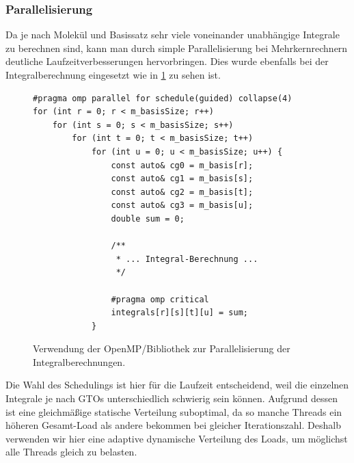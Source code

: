 \subsubsection{Parallelisierung}
Da je nach Molekül und Basissatz sehr viele voneinander unabhängige Integrale zu berechnen sind,
kann man durch simple Parallelisierung bei Mehrkernrechnern deutliche Laufzeitverbesserungen hervorbringen.
Dies wurde ebenfalls bei der Integralberechnung eingesetzt wie in \cref{parallel-impl} zu sehen ist.

\begin{figure}[H]
\begin{verbatim}
#pragma omp parallel for schedule(guided) collapse(4)
for (int r = 0; r < m_basisSize; r++)
    for (int s = 0; s < m_basisSize; s++)
        for (int t = 0; t < m_basisSize; t++)
            for (int u = 0; u < m_basisSize; u++) {
                const auto& cg0 = m_basis[r];
                const auto& cg1 = m_basis[s];
                const auto& cg2 = m_basis[t];
                const auto& cg3 = m_basis[u];
                double sum = 0;

                /**
                 * ... Integral-Berechnung ...
                 */
                
                #pragma omp critical
                integrals[r][s][t][u] = sum;
            }
\end{verbatim}
\caption{Verwendung der OpenMP\-/Bibliothek zur Parallelisierung der Integralberechnungen.}
\label{parallel-impl}
\end{figure}

Die Wahl des Schedulings ist hier für die Laufzeit entscheidend,
weil die einzelnen Integrale je nach GTOs unterschiedlich schwierig sein können.
Aufgrund dessen ist eine gleichmäßige statische Verteilung suboptimal,
da so manche Threads ein höheren Gesamt-Load als andere bekommen bei gleicher Iterationszahl.
Deshalb verwenden wir hier eine adaptive dynamische Verteilung des Loads,
um möglichst alle Threads gleich zu belasten.
